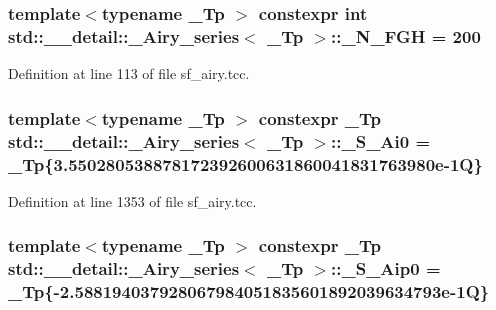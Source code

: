 \subsubsection[{\texorpdfstring{\+\_\+\+N\+\_\+\+F\+GH}{_N_FGH}}]{\setlength{\rightskip}{0pt plus 5cm}template$<$typename \+\_\+\+Tp $>$ constexpr int {\bf std\+::\+\_\+\+\_\+detail\+::\+\_\+\+Airy\+\_\+series}$<$ \+\_\+\+Tp $>$\+::\+\_\+\+N\+\_\+\+F\+GH = 200\hspace{0.3cm}{\ttfamily [static]}}\hypertarget{classstd_1_1____detail_1_1__Airy__series_a01e903f238d8c10c82cea4c115612ad8}{}\label{classstd_1_1____detail_1_1__Airy__series_a01e903f238d8c10c82cea4c115612ad8}


Definition at line 113 of file sf\+\_\+airy.\+tcc.

\subsubsection[{\texorpdfstring{\+\_\+\+S\+\_\+\+Ai0}{_S_Ai0}}]{\setlength{\rightskip}{0pt plus 5cm}template$<$typename \+\_\+\+Tp $>$ constexpr \+\_\+\+Tp {\bf std\+::\+\_\+\+\_\+detail\+::\+\_\+\+Airy\+\_\+series}$<$ \+\_\+\+Tp $>$\+::\+\_\+\+S\+\_\+\+Ai0 = \+\_\+\+Tp\{3.\+550280538878172392600631860041831763980e-\/1\+Q\}\hspace{0.3cm}{\ttfamily [static]}}\hypertarget{classstd_1_1____detail_1_1__Airy__series_a530108939a1c52d530e1d2ff577195b2}{}\label{classstd_1_1____detail_1_1__Airy__series_a530108939a1c52d530e1d2ff577195b2}


Definition at line 1353 of file sf\+\_\+airy.\+tcc.

\subsubsection[{\texorpdfstring{\+\_\+\+S\+\_\+\+Aip0}{_S_Aip0}}]{\setlength{\rightskip}{0pt plus 5cm}template$<$typename \+\_\+\+Tp $>$ constexpr \+\_\+\+Tp {\bf std\+::\+\_\+\+\_\+detail\+::\+\_\+\+Airy\+\_\+series}$<$ \+\_\+\+Tp $>$\+::\+\_\+\+S\+\_\+\+Aip0 = \+\_\+\+Tp\{-\/2.\+588194037928067984051835601892039634793e-\/1\+Q\}\hspace{0.3cm}{\ttfamily [static]}}\hypertarget{classstd_1_1____detail_1_1__Airy__series_a9a0a96224f581add2488a885f08c810f}{}\label{classstd_1_1____detail_1_1__Airy__series_a9a0a96224f581add2488a885f08c810f}


